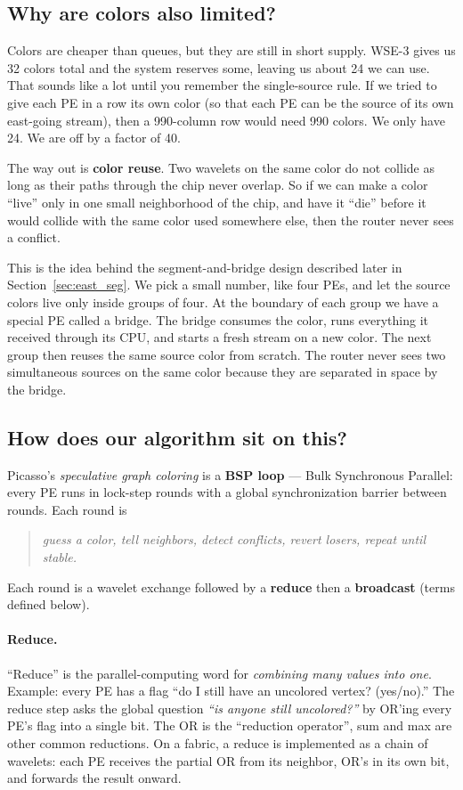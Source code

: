 \documentclass[11pt]{article}
\begin{document}
\subsection{Why are colors also limited?}

Colors are cheaper than queues, but they are still in short
supply. WSE-3 gives us 32 colors total and the system reserves
some, leaving us about 24 we can use. That sounds like a lot
until you remember the single-source rule. If we tried to give
each PE in a row its own color (so that each PE can be the
source of its own east-going stream), then a 990-column row
would need 990 colors. We only have 24. We are off by a factor
of 40.

The way out is \textbf{color reuse}. Two wavelets on the same
color do not collide as long as their paths through the chip
never overlap. So if we can make a color ``live'' only in one
small neighborhood of the chip, and have it ``die'' before it
would collide with the same color used somewhere else, then
the router never sees a conflict.

This is the idea behind the segment-and-bridge design described
later in Section~\ref{sec:east_seg}. We pick a small number,
like four PEs, and let the source colors live only inside
groups of four. At the boundary of each group we have a special
PE called a bridge. The bridge consumes the color, runs
everything it received through its CPU, and starts a fresh
stream on a new color. The next group then reuses the same
source color from scratch. The router never sees two
simultaneous sources on the same color because they are
separated in space by the bridge.

\subsection{How does our algorithm sit on this?}
Picasso's \emph{speculative graph coloring} is a \textbf{BSP loop}
--- Bulk Synchronous Parallel: every PE runs in lock-step rounds
with a global synchronization barrier between rounds. Each round
is

\begin{quote}
\emph{guess a color, tell neighbors, detect conflicts, revert
losers, repeat until stable.}
\end{quote}

Each round is a wavelet exchange followed by a \textbf{reduce}
then a \textbf{broadcast} (terms defined below).

\paragraph{Reduce.} ``Reduce'' is the parallel-computing word for
\emph{combining many values into one}. Example: every PE has a
flag ``do I still have an uncolored vertex? (yes/no).'' The reduce
step asks the global question \emph{``is anyone still
uncolored?''} by OR'ing every PE's flag into a single bit. The OR
is the ``reduction operator'', sum and max are other common
reductions. On a fabric, a reduce is implemented as a chain of
wavelets: each PE receives the partial OR from its neighbor, OR's
in its own bit, and forwards the result onward.
\end{document}
